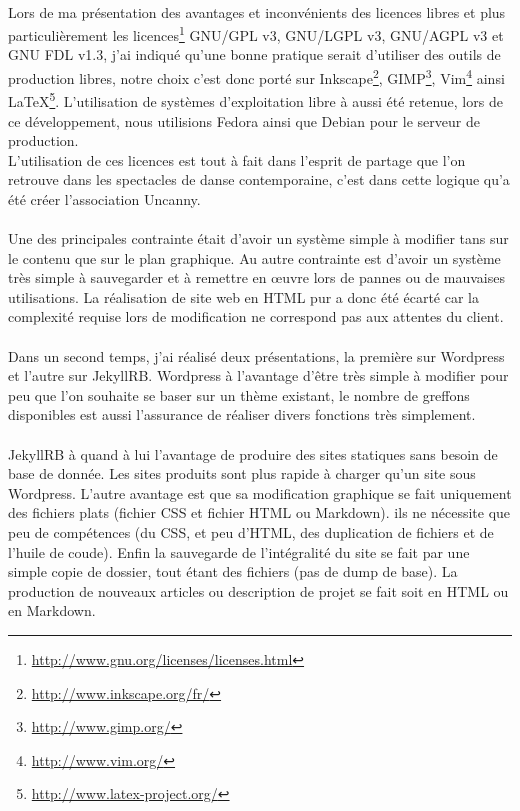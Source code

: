 \documentclass[11pt,a4paper]{report}
\begin{document}
		\paragraph*{}Lors de ma présentation des avantages et inconvénients des licences libres et plus particulièrement les licences\footnote{\url{http://www.gnu.org/licenses/licenses.html}} GNU/GPL v3, GNU/LGPL v3, GNU/AGPL v3 et GNU FDL v1.3, j'ai indiqué qu'une bonne pratique serait d'utiliser des outils de production libres, notre choix c'est donc porté sur Inkscape\footnote{\url{http://www.inkscape.org/fr/}}, GIMP\footnote{\url{http://www.gimp.org/}}, Vim\footnote{\url{http://www.vim.org/}} ainsi \LaTeX \footnote{\url{http://www.latex-project.org/}}. L'utilisation de systèmes d'exploitation libre à aussi été retenue, lors de ce développement, nous utilisions Fedora ainsi que Debian pour le serveur de production.\\
		L'utilisation de ces licences est tout à fait dans l'esprit de partage que l'on retrouve dans les spectacles de danse contemporaine, c'est dans cette logique qu'a été créer l'association Uncanny.
		\paragraph*{}Une des principales contrainte était d'avoir un système simple à modifier tans sur le contenu que sur le plan graphique. Au autre contrainte est d'avoir un système très simple à sauvegarder et à remettre en œuvre lors de pannes ou de mauvaises utilisations. La réalisation de site web en HTML pur a donc été écarté car la complexité requise lors de modification ne correspond pas aux attentes du client.
		\paragraph*{}Dans un second temps, j'ai réalisé deux présentations, la première sur Wordpress et l'autre sur JekyllRB.
		Wordpress à l'avantage d'être très simple à modifier pour peu que l'on souhaite se baser sur un thème existant, le nombre de greffons disponibles est aussi l'assurance de réaliser divers fonctions très simplement.
		\paragraph*{}JekyllRB à quand à lui l'avantage de produire des sites statiques sans besoin de base de donnée. Les sites produits sont plus rapide à charger qu'un site sous Wordpress. L'autre avantage est que sa modification graphique se fait uniquement des fichiers plats (fichier CSS et fichier HTML ou Markdown). ils ne nécessite que peu de compétences (du CSS, et peu d'HTML, des duplication de fichiers et de l'huile de coude). Enfin la sauvegarde de l'intégralité du site se fait par une simple copie de dossier, tout étant des fichiers (pas de dump de base). La production de nouveaux articles ou description de projet se fait soit en HTML ou en Markdown.
\end{document}
